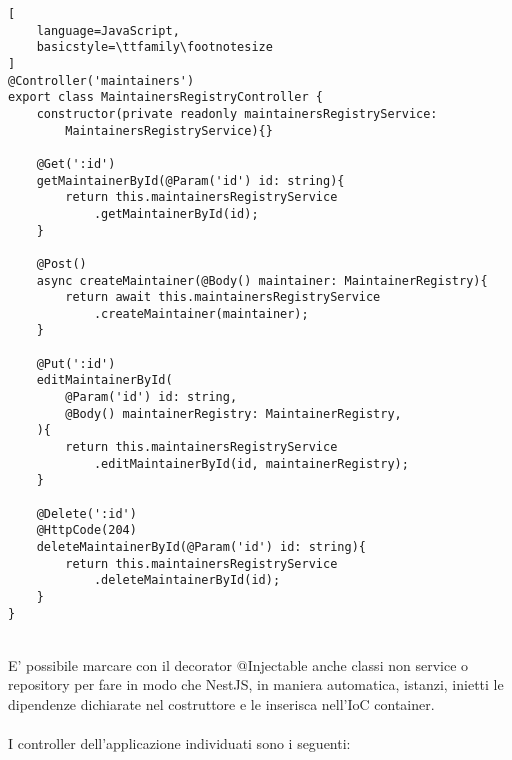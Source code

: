 \begin{lstlisting}[
    language=JavaScript,
    basicstyle=\ttfamily\footnotesize
]
@Controller('maintainers')
export class MaintainersRegistryController {
    constructor(private readonly maintainersRegistryService: 
        MaintainersRegistryService){}

    @Get(':id')
    getMaintainerById(@Param('id') id: string){
        return this.maintainersRegistryService
            .getMaintainerById(id);
    }

    @Post()
    async createMaintainer(@Body() maintainer: MaintainerRegistry){
        return await this.maintainersRegistryService
            .createMaintainer(maintainer);
    }

    @Put(':id')
    editMaintainerById(
        @Param('id') id: string,
        @Body() maintainerRegistry: MaintainerRegistry,
    ){
        return this.maintainersRegistryService
            .editMaintainerById(id, maintainerRegistry);
    }

    @Delete(':id')
    @HttpCode(204)
    deleteMaintainerById(@Param('id') id: string){
        return this.maintainersRegistryService
            .deleteMaintainerById(id);
    }
}
\end{lstlisting}
\leavevmode\newline
\\
E' possibile marcare con il decorator @Injectable
anche classi non service o repository per fare in modo che NestJS, in maniera automatica, istanzi, inietti le dipendenze 
dichiarate nel costruttore e le inserisca nell'IoC container.
\\\\
I controller dell'applicazione individuati sono i seguenti:
